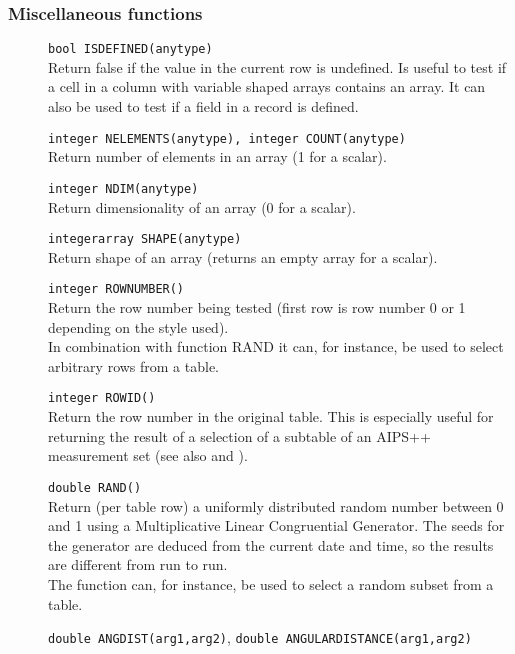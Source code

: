 \subsubsection{Miscellaneous functions}
\begin{description}
  \item[] \texttt{bool ISDEFINED(anytype)}\\
    Return false if the value in the current row is undefined. Is
    useful to test if a cell in a column with variable shaped arrays
    contains an array. It can also be used to test if a field in a
    record is defined.
  \item[] \texttt{integer NELEMENTS(anytype), integer COUNT(anytype)}\\
    Return number of elements in an array (1 for a scalar).
  \item[] \texttt{integer NDIM(anytype)}\\
    Return dimensionality of an array (0 for a scalar).
  \item[] \texttt{integerarray SHAPE(anytype)}\\
    Return shape of an array (returns an empty array for a scalar).
  \item[] \texttt{integer ROWNUMBER()}\\
    Return the row number being tested (first row is row number 0 or 1
    depending on the style used).
    \\In combination with function RAND it can, for instance,
    be used to select arbitrary rows from a table.
  \item[] \texttt{integer ROWID()}\\
    Return the row number in the original table. This is especially
    useful for returning the result of a selection of a subtable
    of an AIPS++ measurement set
    (see also 
    and ).
  \item[] \texttt{double RAND()}\\
    Return (per table row) a uniformly distributed random number
    between 0 and 1 using a Multiplicative Linear Congruential Generator.
    The seeds for the generator are deduced from the current date and
    time, so the results are different from run to run.
    \\The function can, for instance, be used to select a random
    subset from a table.
  \item[] \texttt{double ANGDIST(arg1,arg2)},
              \texttt{double ANGULARDISTANCE(arg1,arg2)}\\

\end{description}
